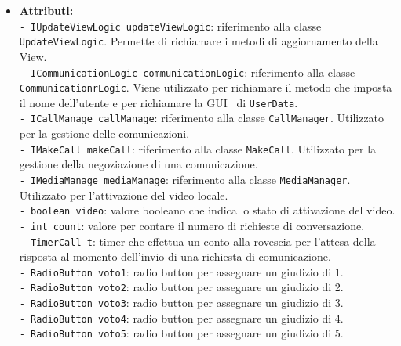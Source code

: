 {\begin{sloppypar}
{\begin{itemize}
\begin{itemize}
				Tramite le interfacce:
				\begin{itemize}
					\item[] ;
					\item[] ;
					\item[] ;
					\item[] ;
					\item[] .
				\end{itemize}
				\item[]  \textbf{Attributi:} \\
					\texttt{- IUpdateViewLogic updateViewLogic}: riferimento alla classe \texttt{UpdateViewLogic}. 
						Permette di richiamare i metodi di aggiornamento della View.\\
					\texttt{- ICommunicationLogic communicationLogic}: riferimento alla classe 
						\texttt{CommunicationrLogic}. Viene utilizzato per richiamare il metodo che imposta il 
						nome dell’utente e per richiamare la GUI\g~ di \texttt{UserData}.\\
					\texttt{- ICallManage callManage}: riferimento alla classe \texttt{CallManager}. Utilizzato 
						per la gestione delle comunicazioni.\\
					\texttt{- IMakeCall makeCall}: riferimento alla classe \texttt{MakeCall}. Utilizzato per la 
						gestione della negoziazione di una comunicazione.\\
					\texttt{- IMediaManage mediaManage}: riferimento alla classe \texttt{MediaManager}. Utilizzato 
						per l’attivazione del video locale.\\
					\texttt{- boolean video}: valore booleano che indica lo stato di attivazione del video.	\\
					\texttt{- int count}: valore per contare il numero di richieste di conversazione.\\
					\texttt{- TimerCall t}: timer che effettua un conto alla rovescia per l’attesa della risposta 
						al momento dell’invio di una richiesta di comunicazione.\\
					\texttt{- RadioButton voto1}: radio button per assegnare un giudizio di 1.\\
					\texttt{- RadioButton voto2}: radio button per assegnare un giudizio di 2.\\
					\texttt{- RadioButton voto3}: radio button per assegnare un giudizio di 3.\\
					\texttt{- RadioButton voto4}: radio button per assegnare un giudizio di 4.\\
					\texttt{- RadioButton voto5}: radio button per assegnare un giudizio di 5.\\


\end{itemize}
\end{itemize}}
\end{sloppypar}}
